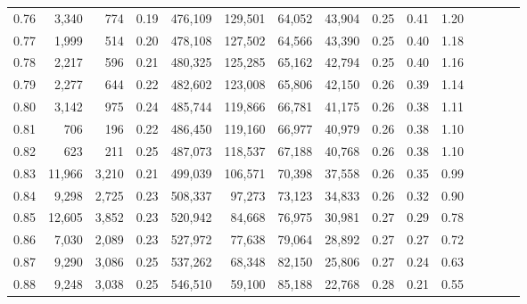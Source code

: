 \begin{tabular}{rrrcrrrrrrrrrrr}
0.76 &   3,340 &     774 &                                       0.19 &  476,109 &  129,501 &   64,052 &   43,904 &  0.25 &  0.41 &                         1.20 \\
0.77 &   1,999 &     514 &                                       0.20 &  478,108 &  127,502 &   64,566 &   43,390 &  0.25 &  0.40 &                         1.18 \\
0.78 &   2,217 &     596 &                                       0.21 &  480,325 &  125,285 &   65,162 &   42,794 &  0.25 &  0.40 &                         1.16 \\
0.79 &   2,277 &     644 &                                       0.22 &  482,602 &  123,008 &   65,806 &   42,150 &  0.26 &  0.39 &                         1.14 \\
0.80 &   3,142 &     975 &                                       0.24 &  485,744 &  119,866 &   66,781 &   41,175 &  0.26 &  0.38 &                         1.11 \\
0.81 &     706 &     196 &                                       0.22 &  486,450 &  119,160 &   66,977 &   40,979 &  0.26 &  0.38 &                         1.10 \\
0.82 &     623 &     211 &                                       0.25 &  487,073 &  118,537 &   67,188 &   40,768 &  0.26 &  0.38 &                         1.10 \\
0.83 &  11,966 &   3,210 &                                       0.21 &  499,039 &  106,571 &   70,398 &   37,558 &  0.26 &  0.35 &                         0.99 \\
0.84 &   9,298 &   2,725 &                                       0.23 &  508,337 &   97,273 &   73,123 &   34,833 &  0.26 &  0.32 &                         0.90 \\
0.85 &  12,605 &   3,852 &                                       0.23 &  520,942 &   84,668 &   76,975 &   30,981 &  0.27 &  0.29 &                         0.78 \\
0.86 &   7,030 &   2,089 &                                       0.23 &  527,972 &   77,638 &   79,064 &   28,892 &  0.27 &  0.27 &                         0.72 \\
0.87 &   9,290 &   3,086 &                                       0.25 &  537,262 &   68,348 &   82,150 &   25,806 &  0.27 &  0.24 &                         0.63 \\
0.88 &   9,248 &   3,038 &                                       0.25 &  546,510 &   59,100 &   85,188 &   22,768 &  0.28 &  0.21 &                         0.55 \\

\end{tabular}
